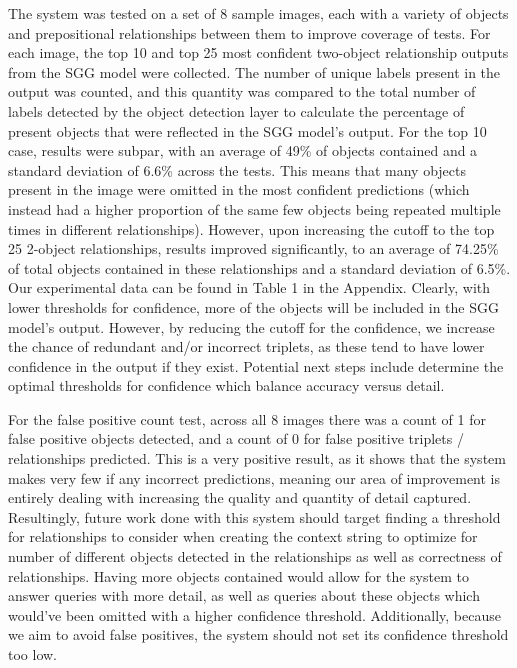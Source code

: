 \documentclass[letterpaper, 10 pt, conference]{ieeeconf}  %
\begin{document}
    The system was tested on a set of 8 sample images, each with a variety of objects and prepositional relationships between them to improve coverage of tests. For each image, the top 10 and top 25 most confident two-object relationship outputs from the SGG model were collected. The number of unique labels present in the output was counted, and this quantity was compared to the total number of labels detected by the object detection layer to calculate the percentage of present objects that were reflected in the SGG model's output. For the top 10 case, results were subpar, with an average of 49\% of objects contained and a standard deviation of 6.6\% across the tests. This means that many objects present in the image were omitted in the most confident predictions (which instead had a higher proportion of the same few objects being repeated multiple times in different relationships). However, upon increasing the cutoff to the top 25 2-object relationships, results improved significantly, to an average of 74.25\% of total objects contained in these relationships and a standard deviation of 6.5\%. Our experimental data can be found in Table 1 in the Appendix. Clearly, with lower thresholds for confidence, more of the objects will be included in the SGG model's output. However, by reducing the cutoff for the confidence, we increase the chance of redundant and/or incorrect triplets, as these tend to have lower confidence in the output if they exist. Potential next steps include determine the optimal thresholds for confidence which balance accuracy versus detail. 
    
    For the false positive count test, across all 8 images there was a count of 1 for false positive objects detected, and a count of 0 for false positive triplets / relationships predicted. This is a very positive result, as it shows that the system makes very few if any incorrect predictions, meaning our area of improvement is entirely dealing with increasing the quality and quantity of detail captured. Resultingly, future work done with this system should target finding a threshold for relationships to consider when creating the context string to optimize for number of different objects detected in the relationships as well as correctness of relationships. Having more objects contained would allow for the system to answer queries with more detail, as well as queries about these objects which would've been omitted with a higher confidence threshold. Additionally, because we aim to avoid false positives, the system should not set its confidence threshold too low.
\end{document}
